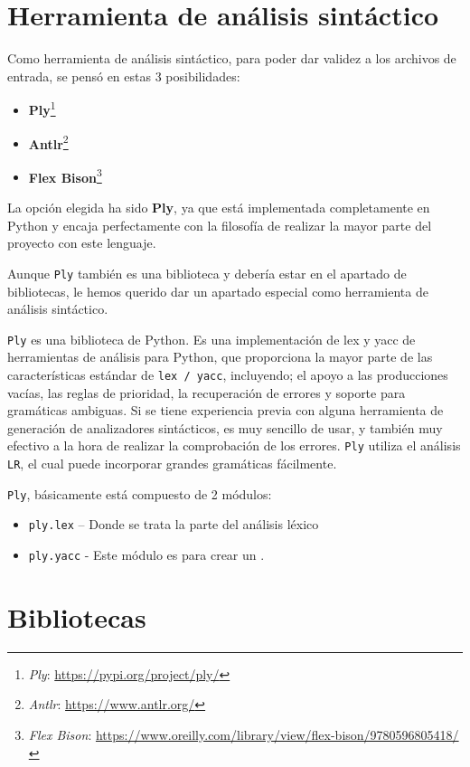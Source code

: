 \section{Herramienta de análisis sintáctico}

Como herramienta de análisis sintáctico, para poder dar validez a los archivos de entrada, se pensó en estas 3 posibilidades:
\begin{itemize}
\item \textbf{Ply}\footnote{\textsl{Ply}: \url{https://pypi.org/project/ply/}}
\item \textbf{Antlr}\footnote{\textsl{Antlr}: \url{https://www.antlr.org/}}
\item \textbf{Flex Bison}\footnote{\textsl{Flex Bison}: \url{https://www.oreilly.com/library/view/flex-bison/9780596805418/}}
\end{itemize}

La opción elegida ha sido \textbf{Ply}, ya que está implementada completamente en Python y encaja perfectamente con la filosofía de realizar la mayor parte del proyecto con este lenguaje.

Aunque \texttt{\texttt{Ply}} también es una biblioteca y debería estar en el apartado de bibliotecas, le hemos querido dar un apartado especial como herramienta de análisis sintáctico.

\texttt{Ply} es una biblioteca de Python. Es una implementación de lex y yacc de herramientas de análisis para Python, que proporciona la mayor parte de las características estándar de \texttt{lex / yacc}, incluyendo; el apoyo a las producciones vacías, las reglas de prioridad, la recuperación de errores y soporte para gramáticas ambiguas. Si se tiene experiencia previa con alguna herramienta de generación de analizadores sintácticos, es muy sencillo de usar, y también muy efectivo a la hora de realizar la comprobación de los errores. \texttt{Ply} utiliza el análisis \texttt{LR}, el cual puede incorporar grandes gramáticas fácilmente.

\texttt{Ply}, básicamente está compuesto de 2 módulos:
\begin{itemize}
\item \texttt{ply.lex} – Donde se trata la parte del análisis léxico
\item \texttt{ply.yacc} -  Este módulo es para crear un .
\end{itemize}

\section{Bibliotecas}

